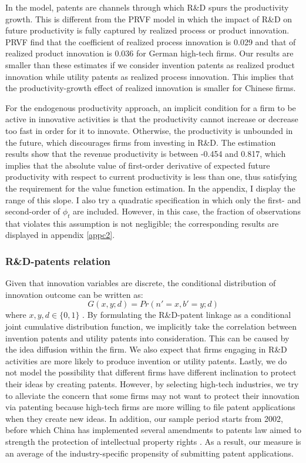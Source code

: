 \documentclass[English]{article}
\begin{document}
In the model, patents are channels through which
R\&D spurs the productivity growth. This is different from the PRVF model in which the impact of R\&D on future productivity is fully captured by realized
process or product innovation. PRVF find
that the coefficient of realized process innovation is 0.029 and that
of realized product innovation is 0.036 for German high-tech firms.
Our results are smaller than these estimates if we consider invention
patents as realized product innovation while utility patents as realized
process innovation. This implies that the productivity-growth effect of realized innovation is smaller for Chinese firms. 

For the endogenous productivity approach, an implicit condition for
a firm to be active in innovative activities is that the productivity
cannot increase or decrease too fast in order for it to innovate. Otherwise, the productivity is unbounded in the future, which discourages firms from investing in R\&D. The estimation results show that the revenue productivity is between -0.454 and 0.817, which implies that the absolute value of first-order derivative of expected future productivity with respect to current productivity is less than one, thus satisfying the requirement for the value function estimation. In the appendix, I display the range of this slope. I also try a quadratic specification
in which only the first- and second-order of $\phi_{t}$ are included. However, in this case, the fraction of observations that violates this assumption is not negligible; the corresponding results are displayed in appendix \ref{appc2}.

\subsubsection{R\&D-patents relation}
 Given that innovation variables are discrete, the conditional distribution of innovation outcome can be written as:
  \begin{equation}
      G(x,y;d) = Pr(n'=x,b'=y;d)
  \end{equation}
where $x,y,d\in\{0,1\}$
  . By formulating the R\&D-patent linkage as
a conditional joint cumulative distribution function, we implicitly
take the correlation between invention patents and utility patents
into consideration. This can be caused by the
idea diffusion within the firm. We also expect that firms engaging
in R\&D activities are more likely to produce invention or utility
patents. Lastly, we do not model the possibility that different firms have different inclination to protect their ideas by creating patents. 
However, by selecting high-tech industries, we try to alleviate the concern that some firms may not want to protect their innovation via patenting because high-tech firms are more willing to file patent applications
when they create new ideas. 
In addition, our sample period starts
from 2002, before which China has implemented several amendments to
patents law aimed to strength the protection of intellectual property
rights \citep{Hu2009}. As a result, our measure is an average of the industry-specific propensity of submitting patent applications.
\end{document}
